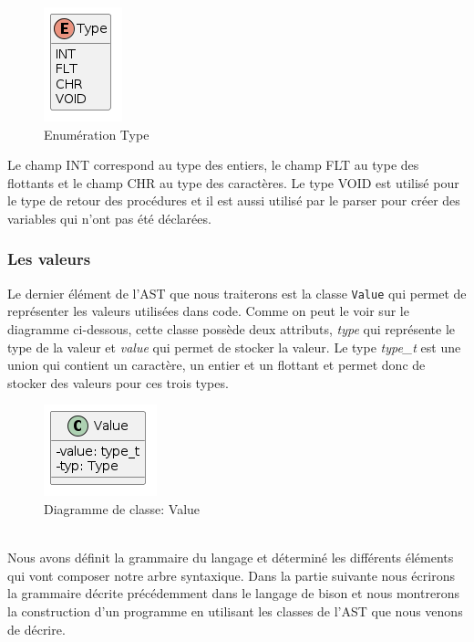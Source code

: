 \documentclass[a4paper]{article}%
\begin{document}
\begin{figure}[h!]
  \begin{center}
  \includegraphics[scale=0.5]{../ressources/diagrams/Type.png}
  \caption{Enumération Type}
  \end{center}
\end{figure}

Le champ INT correspond au type des entiers, le champ FLT au type des flottants
et le champ CHR au type des caractères. Le type VOID est utilisé pour le type de
retour des procédures et il est aussi utilisé par le \gls{parser} pour créer des
variables qui n'ont pas été déclarées.

\subsubsection*{Les valeurs}

Le dernier élément de l'AST que nous traiterons est la classe \lstinline{Value}
qui permet de représenter les valeurs utilisées dans code. Comme on peut le voir
sur le diagramme ci-dessous, cette classe possède deux attributs, \textit{type}
qui représente le type de la valeur et \textit{value} qui permet de stocker la
valeur. Le type \textit{type\_t} est une union qui contient un caractère, un
entier et un flottant et permet donc de stocker des valeurs pour ces trois
types.

\begin{figure}[h!]
  \begin{center}
  \includegraphics[scale=0.5]{../ressources/diagrams/value.png}
  \caption{Diagramme de classe: Value}
  \end{center}
\end{figure}
~\\

Nous avons définit la grammaire du langage et déterminé les différents éléments
qui vont composer notre arbre syntaxique. Dans la partie suivante nous écrirons
la grammaire décrite précédemment dans le langage de bison et nous montrerons
la construction d'un programme en utilisant les classes de l'AST que nous
venons de décrire.
\end{document}
